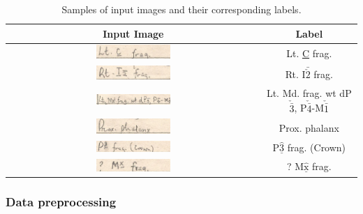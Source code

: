 \documentclass[english,twoside,openright]{HYgraduMLDS}
\begin{document}
\begin{table}[h!]
    \centering
    \begin{tabular}{|c|c|}
        \hline
        \textbf{Input Image} & \textbf{Label} \\
        \hline
        \includegraphics[width=0.3\textwidth]{../images/data_samples/canine.png} & Lt. \underline{C} frag. \\
        \hline
        \includegraphics[width=0.3\textwidth]{../images/data_samples/lowjawincisor.png} & Rt. I$\bar{\check{2}}$ frag. \\
        \hline
        \includegraphics[width=0.3\textwidth]{../images/data_samples/multipleteeth.png} & Lt. Md. frag. wt dP$\check{\bar{3}}$, P$\check{\bar{4}}$-M$\check{\bar{1}}$\\
        \hline
        \includegraphics[width=0.3\textwidth]{../images/data_samples/nontooth.png} & Prox. phalanx \\
        \hline
        \includegraphics[width=0.3\textwidth]{../images/data_samples/smudged.png} & P$\hat{\underline{\text{3}}}$ frag. (Crown) \\
        \hline
        \includegraphics[width=0.3\textwidth]{../images/data_samples/underlinedx.png} & ? M$\hat{\underline{\text{x}}}$ frag. \\
        \hline
    \end{tabular}
    \caption{Samples of input images and their corresponding labels.}
    \label{table:input_images}
\end{table}

\subsubsection{Data preprocessing}
\end{document}
